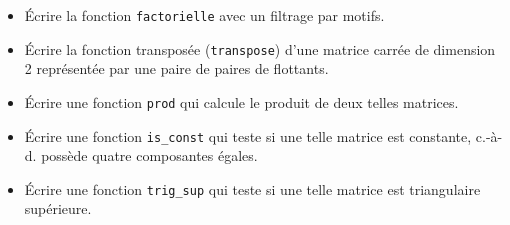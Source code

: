 \documentclass[11pt, a4paper]{article}
\begin{document}
\begin{itemize}

  \item Écrire la fonction \verb+factorielle+ avec un filtrage par
  motifs.

  \item Écrire la fonction transposée (\texttt{transpose}) d'une
  matrice carrée de dimension 2 représentée par une paire de paires de
  flottants.

  \item Écrire une fonction \texttt{prod} qui calcule le produit de
  deux telles matrices.

  \item Écrire une fonction \texttt{is\_const} qui teste si une telle
  matrice est const\-an\-te, c.-à-d. possède quatre composantes égales.

  \item Écrire une fonction \texttt{trig\_sup} qui teste si une telle
  matrice est triangulaire supérieure.
\end{itemize}
\end{document}
